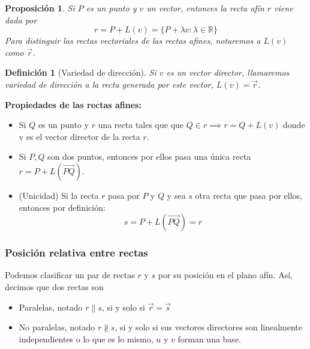\documentclass[11pt, a4paper, titlepage]{article}
\makeatletter
\renewenvironment{proof}[1][\proofname] {\vspace{-15pt}\par\pushQED{\qed}\normalfont\topsep6\p@\@plus6\p@\relax\trivlist\item[\hskip\labelsep\it#1\@addpunct{.}]\ignorespaces}{\popQED\endtrivlist\@endpefalse}
\newcommand{\R}{\mathbb{R}}
\renewcommand{\vec}{\overrightarrow}
\theoremstyle{theorem-style}
\newtheorem*{nprop}{Proposición}
\theoremstyle{definition-style}
\newtheorem*{ndef}{Definición}
\theoremstyle{remark-style}
\theoremstyle{example-style}
\makeatother
\begin{document}
\begin{nprop}
	Si $P$ es un punto y $v$ un vector, entonces la recta afín $r$ viene dada por
	\[
	r = P+L(v) = \{P + \lambda v : \lambda \in \R\}
	\]
	Para distinguir las rectas vectoriales de las rectas afines, notaremos a $L(v)$ como $\vec{r}$.
\end{nprop}
\begin{ndef}[Variedad de dirección]
	Si $v$ es un \textit{vector director}, llamaremos \textit{variedad de dirección} a la recta generada por este vector, $L(v) = \vec{r}$.
\end{ndef}

\textbf{Propiedades de las rectas afines:}
\begin{itemize}
	\item Si $Q$ es un punto y $r$ una recta tales que que $Q\in r \implies r = Q +L(v)$ donde v es el vector director de la recta $r$.
	\item Si $P,Q$ son dos puntos, entonces por ellos pasa una única recta $r = P +L(\overrightarrow{PQ})$. \\
	\begin{proof}
	(Unicidad) Si la recta $r$ pasa por $P$ y $Q$ y sea $s$ otra recta que pasa por ellos, entonces por definición:
	\[
	s = P+L(\overrightarrow{PQ}) = r
	\]
\end{proof}
\end{itemize}

\subsubsection{Posición relativa entre rectas}

Podemos clasificar un par de rectas $r$ y $s$ por su posición en el plano afín. Así, decimos que dos rectas son

\begin{itemize}
	\item Paralelas, notado $r\parallel s$, si y solo si $\vec{r} = \vec{s}$
	\item No paralelas, notado $r\nparallel s$, si y solo si sus vectores directores son linealmente independientes o lo que es lo mismo, $u$ y $v$ forman una base.
\end{itemize}
\end{document}
